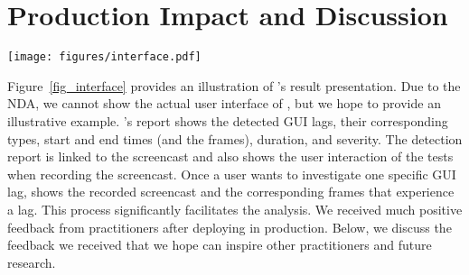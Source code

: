 \section{Production Impact and Discussion}
\label{sec:discussion}
\begin{figure*}
	\centering
    \texttt{[image: figures/interface.pdf]}
	\caption{An illustrative interface of \tool. Due to the NDA, we cannot show the actual interface of \tool. However, to better showcase \tool, we created an illustration of how the result may be presented. \tool's report shows the detected GUI lags, their corresponding types, start and end times (and the frames), duration, and severity.}
	\label{fig_interface}
\end{figure*}
Figure~\ref{fig_interface} provides an illustration of \tool's result presentation. Due to the NDA, we cannot show the actual user interface of \tool, but we hope to provide an illustrative example. \tool's report shows the detected GUI lags, their corresponding types, start and end times (and the frames), duration, and severity. The detection report is linked to the screencast and also shows the user interaction of the tests when recording the screencast. Once a user wants to investigate one specific GUI lag, \tool shows the recorded screencast and the corresponding frames that experience a lag. This process significantly facilitates the analysis. We received much positive feedback from practitioners after deploying \tool in production. Below, we discuss the feedback we received that we hope can inspire other practitioners and future research. 

